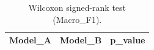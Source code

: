 \begin{table}[t]
\centering
\begin{tabular}{lll}
\toprule
Model_A & Model_B & p_value \\
\midrule
\bottomrule
\end{tabular}
\caption{Wilcoxon signed-rank test (Macro_F1).}
\label{tab:wilcoxon_Macro_F1}
\end{table}